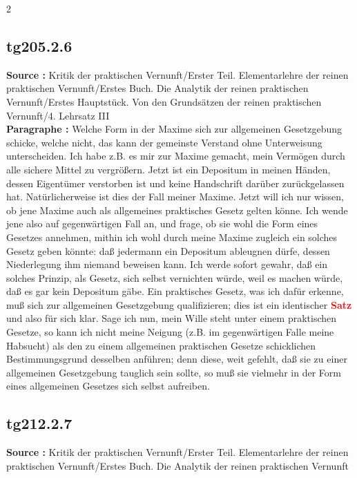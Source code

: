 \documentclass[a4paper,12pt,twoside]{book}
\newcommand{\match}[1]{\textcolor{red}{\textbf{#1}}}
\begin{document}
	
	2
	
	
	
	\subsection*{tg205.2.6} 
	\textbf{Source : }Kritik der praktischen Vernunft/Erster Teil. Elementarlehre der reinen praktischen Vernunft/Erstes Buch. Die Analytik der reinen praktischen Vernunft/Erstes Hauptstück. Von den Grundsätzen der reinen praktischen Vernunft/4. Lehrsatz III\\  
	
	\noindent\textbf{Paragraphe : }Welche Form in der Maxime sich zur allgemeinen Gesetzgebung schicke, welche nicht, das kann der gemeinste Verstand ohne Unterweisung unterscheiden. Ich habe z.B. es mir zur Maxime gemacht, mein Vermögen durch alle sichere Mittel zu vergrößern. Jetzt ist ein Depositum in meinen Händen, dessen Eigentümer verstorben ist und keine Handschrift darüber zurückgelassen hat. Natürlicherweise ist dies der Fall meiner Maxime. Jetzt will ich nur wissen, ob jene Maxime auch als allgemeines praktisches Gesetz gelten könne. Ich wende jene also auf gegenwärtigen Fall an, und frage, ob sie wohl die Form eines Gesetzes annehmen, mithin ich wohl durch meine Maxime zugleich ein solches Gesetz geben könnte: daß jedermann ein Depositum ableugnen dürfe, dessen Niederlegung ihm niemand beweisen kann. Ich werde sofort gewahr, daß ein solches Prinzip, als Gesetz, sich selbst vernichten würde, weil es machen würde, daß es gar kein Depositum gäbe. Ein praktisches Gesetz, was ich dafür erkenne, muß sich zur allgemeinen Gesetzgebung qualifizieren; dies ist ein identischer \match{Satz} und also für sich klar. Sage ich nun, mein Wille steht unter einem praktischen Gesetze, so kann ich nicht meine Neigung (z.B. im gegenwärtigen Falle meine Habsucht) als den zu einem allgemeinen praktischen Gesetze schicklichen Bestimmungsgrund desselben anführen; denn diese, weit gefehlt, daß sie zu einer allgemeinen Gesetzgebung tauglich sein sollte, so muß sie vielmehr in der Form eines allgemeinen Gesetzes sich selbst aufreiben. 
	
	\subsection*{tg212.2.7} 
	\textbf{Source : }Kritik der praktischen Vernunft/Erster Teil. Elementarlehre der reinen praktischen Vernunft/Erstes Buch. Die Analytik der reinen praktischen Vernunft\\  
	
\end{document}
